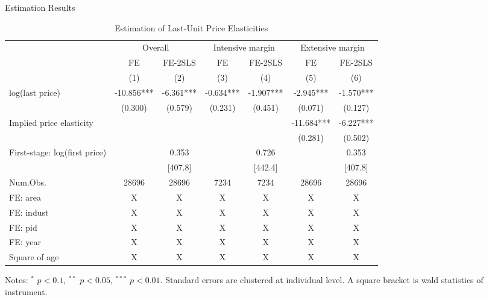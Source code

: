 \documentclass[
  ignorenonframetext,
  aspectratio=169,
]{beamer}
\begin{document}
\begin{frame}{Estimation Results}
\protect\hypertarget{estimation-results}{}
\begin{table}

\caption{\label{tab:MainElasticity}Estimation of Last-Unit Price Elasticities}
\centering
\fontsize{7}{9}\selectfont
\begin{threeparttable}
\begin{tabular}[t]{lcccccc}
\toprule
\multicolumn{1}{c}{ } & \multicolumn{2}{c}{Overall} & \multicolumn{2}{c}{Intensive margin} & \multicolumn{2}{c}{Extensive margin} \\
\cmidrule(l{3pt}r{3pt}){2-3} \cmidrule(l{3pt}r{3pt}){4-5} \cmidrule(l{3pt}r{3pt}){6-7}
\multicolumn{1}{c}{ } & \multicolumn{1}{c}{FE} & \multicolumn{1}{c}{FE-2SLS} & \multicolumn{1}{c}{FE} & \multicolumn{1}{c}{FE-2SLS} & \multicolumn{1}{c}{FE} & \multicolumn{1}{c}{FE-2SLS} \\
\cmidrule(l{3pt}r{3pt}){2-2} \cmidrule(l{3pt}r{3pt}){3-3} \cmidrule(l{3pt}r{3pt}){4-4} \cmidrule(l{3pt}r{3pt}){5-5} \cmidrule(l{3pt}r{3pt}){6-6} \cmidrule(l{3pt}r{3pt}){7-7}
  & (1) & (2) & (3) & (4) & (5) & (6)\\
\midrule
log(last price) & -10.856*** & -6.361*** & -0.634*** & -1.907*** & -2.945*** & -1.570***\\
 & (0.300) & (0.579) & (0.231) & (0.451) & (0.071) & (0.127)\\
\midrule
Implied price elasticity &  &  &  &  & -11.684*** & -6.227***\\
 &  &  &  &  & (0.281) & (0.502)\\
First-stage: log(first price) &  & 0.353 &  & 0.726 &  & 0.353\\
 &  & [407.8] &  & [442.4] &  & [407.8]\\
Num.Obs. & 28696 & 28696 & 7234 & 7234 & 28696 & 28696\\
FE: area & X & X & X & X & X & X\\
FE: indust & X & X & X & X & X & X\\
FE: pid & X & X & X & X & X & X\\
FE: year & X & X & X & X & X & X\\
Square of age & X & X & X & X & X & X\\
\bottomrule
\end{tabular}
\begin{tablenotes}
\item Notes: $^{*}$ $p < 0.1$, $^{**}$ $p < 0.05$, $^{***}$ $p < 0.01$. Standard errors are clustered at individual level. A square bracket is wald statistics of instrument.
\end{tablenotes}
\end{threeparttable}
\end{table}
\end{frame}
\end{document}
